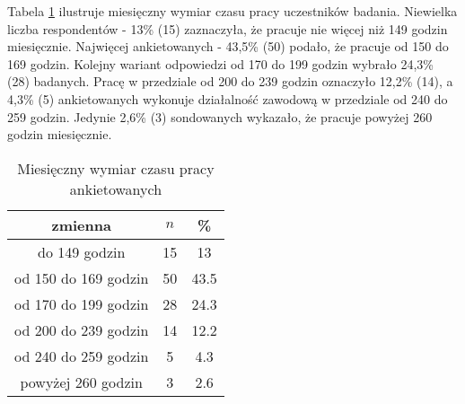 Tabela \ref{tab:Q3} ilustruje miesięczny wymiar czasu pracy uczestników badania. Niewielka liczba respondentów  - 13\% (15) zaznaczyła, że pracuje nie więcej niż 149 godzin miesięcznie.  Najwięcej ankietowanych - 43,5\%  (50) podało, że pracuje od 150 do 169 godzin.  Kolejny wariant odpowiedzi od 170 do 199 godzin wybrało 24,3\% (28) badanych. Pracę w przedziale od 200 do 239 godzin oznaczyło 12,2\% (14), a 4,3\% (5) ankietowanych wykonuje działalność zawodową w przedziale od 240 do 259 godzin. Jedynie 2,6\% (3)  sondowanych wykazało, że pracuje powyżej 260 godzin miesięcznie.


 
\begin{table}[H]
\caption{Miesięczny wymiar czasu pracy ankietowanych}
\centering
\begin{tabular}{ | c | c | c |}
\hline
zmienna & $n$ & \% \\
\hline
do 149 godzin  &  15  & 13 \\
\hline
od 150 do 169 godzin  &  50  & 43.5 \\
\hline
od 170 do 199 godzin  &  28  & 24.3 \\
\hline
od 200 do 239 godzin  &  14  & 12.2 \\
\hline
od 240 do 259 godzin  &  5  & 4.3 \\
\hline
powyżej 260 godzin  &  3  & 2.6 \\
\hline
\end{tabular}
\label{tab:Q3}
\end{table}

